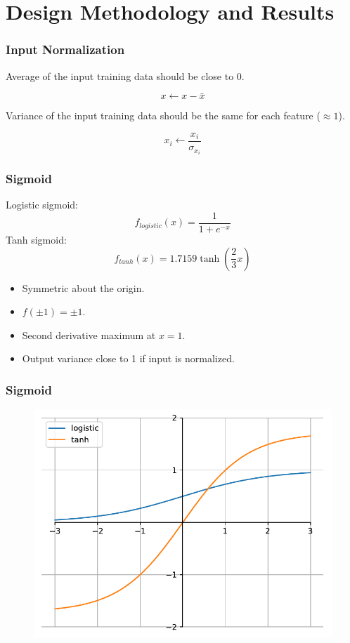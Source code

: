 \documentclass[pdf]{beamer}
\begin{document}
\section{Design Methodology and Results}

\begin{frame}
\frametitle{Input Normalization}

Average of the input training data should be close to 0.

\begin{equation}
x \leftarrow x - \bar{x}
\end{equation}

Variance of the input training data should be the same for each feature ($\approx 1$).

\begin{equation}
x_i \leftarrow \frac{x_i}{\sigma_{x_i}}
\end{equation}

\end{frame}

\begin{frame}
\frametitle{Sigmoid}
Logistic sigmoid:
\begin{equation}
  f_{logistic}(x) = \frac{1}{1 + e^{-x}}
\end{equation}
Tanh sigmoid:
\begin{equation}
  f_{tanh}(x) = 1.7159 \tanh \left( \frac{2}{3} x \right)
\end{equation}
\begin{itemize}
  \item Symmetric about the origin.
  \item $f(\pm1) = \pm1$.
  \item Second derivative maximum at $x=1$.
  \item Output variance close to 1 if input is normalized.
\end{itemize}
\end{frame}

\begin{frame}
\frametitle{Sigmoid}
\begin{figure}[!htb]
  \includegraphics[height=0.8\textheight]{plots/logistic_vs_tanh_function.pdf}
\end{figure}
\end{frame}
\end{document}
